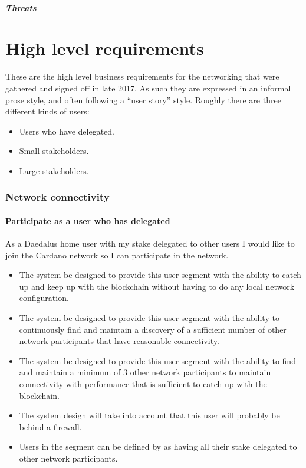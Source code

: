 \documentclass{report}
\newcommand{\wip}[1]{\color{magenta}{#1}\color{black}}
\theoremstyle{definition}{
  \newtheorem{lemma}{Lemma}[section] %
  \newtheorem{definition}[lemma]{Definition}
}
\theoremstyle{theorem}{
  \newtheorem{invariant}[lemma]{Invariant}
  \newtheorem{proofobligation}[lemma]{Proof Obligation}
}
\numberwithin{equation}{lemma}
\begin{document}
\subparagraph{Threats}
\wip{Reference the Threats section.
  'eclipse' can be deterred}


\wip{TODO:extended abstract, scope of the document}

\section{High level requirements}

These are the high level business requirements for the networking that were
gathered and signed off in late 2017. As such they are expressed in an informal
prose style, and often following a ``user story'' style.
Roughly there are three different kinds of users:
\begin{itemize}
\item Users who have delegated.
\item Small stakeholders.
\item Large stakeholders.
\end{itemize}

\subsubsection{Network connectivity}\label{network-connectivity}

\paragraph{Participate as a user who has delegated}

As a Daedalus home user with my stake delegated to other users I would like to
join the Cardano network so I can participate in the network.
\begin{itemize}
\item The system be designed to provide this user segment with the ability
      to catch up and keep up with the blockchain without having to do any local
      network configuration.
\item The system be designed to provide this user segment with the ability to
      continuously find and maintain a discovery of a sufficient number of
      other network participants that have reasonable connectivity.
\item The system be designed to provide this user segment with the ability to
      find and maintain a minimum of 3 other network participants to maintain
      connectivity with performance that is sufficient to catch up with the
      blockchain.
\item The system design will take into account that this user will probably be
      behind a firewall.
\item Users in the segment can be defined by as having all their stake
      delegated to other network participants.
\end{itemize}
\end{document}
